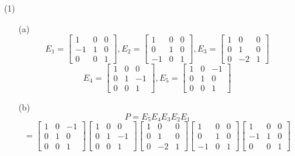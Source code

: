 \begin{itemize}
\item[(1)]
\begin{itemize}
\item[(a)]
$$E_1 = \begin{bmatrix}
1 & 0 & 0 \\
-1 & 1 & 0 \\
0 & 0 & 1
\end{bmatrix}, E_2 = \begin{bmatrix}
1 & 0 & 0 \\
0 & 1 & 0 \\
-1 & 0 & 1
\end{bmatrix}, E_3 = \begin{bmatrix}
1 & 0 & 0 \\
0 & 1 & 0 \\
0 & -2 & 1
\end{bmatrix}$$
$$E_4 = \begin{bmatrix}
1 & 0 & 0 \\
0 & 1 & -1 \\
0 & 0 & 1
\end{bmatrix}, E_5 = \begin{bmatrix}
1 & 0 & -1 \\
0 & 1 & 0 \\
0 & 0 & 1
\end{bmatrix}$$
\item[(b)]
$$P = E_5E_4E_3E_2E_1$$
$$= \begin{bmatrix}
1 & 0 & -1 \\
0 & 1 & 0 \\
0 & 0 & 1
\end{bmatrix}\begin{bmatrix}
1 & 0 & 0 \\
0 & 1 & -1 \\
0 & 0 & 1
\end{bmatrix}\begin{bmatrix}
1 & 0 & 0 \\
0 & 1 & 0 \\
0 & -2 & 1
\end{bmatrix}\begin{bmatrix}
1 & 0 & 0 \\
0 & 1 & 0 \\
-1 & 0 & 1
\end{bmatrix}\begin{bmatrix}
1 & 0 & 0 \\
-1 & 1 & 0 \\
0 & 0 & 1
\end{bmatrix}$$

\end{itemize}
\end{itemize}
